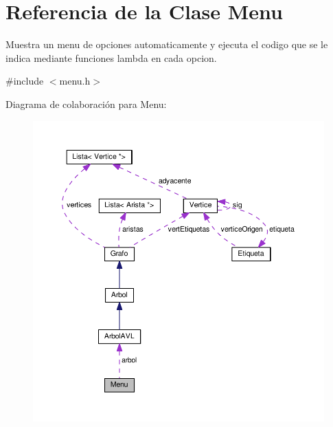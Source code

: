 \hypertarget{classMenu}{}\section{Referencia de la Clase Menu}
\label{classMenu}


Muestra un menu de opciones automaticamente y ejecuta el codigo que se le indica mediante funciones lambda en cada opcion.  




{\ttfamily \#include $<$menu.\+h$>$}



Diagrama de colaboración para Menu\+:\nopagebreak
\begin{figure}[H]
\begin{center}
\leavevmode
\includegraphics[width=350pt]{classMenu__coll__graph}
\end{center}
\end{figure}
